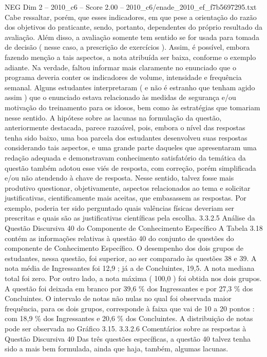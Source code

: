 \begin{textsample}{NEG Dim 2 – 2010\_c6 – Score 2.00 – 2010\_c6/enade\_2010\_ef\_f7b5697295.txt}
Cabe ressaltar, porém, que esses indicadores, em que pese a orientação do razão dos objetivos do praticante, sendo, portanto, dependentes do próprio resultado da avaliação.
Além disso, a avaliação somente tem sentido se for usada para tomada de decisão ( nesse caso, a prescrição de exercícios ).
Assim, é possível, embora fazendo menção a tais aspectos, a nota atribuída ser baixa, conforme o exemplo adiante.
Na verdade, faltou informar mais claramente no enunciado que o programa deveria conter os indicadores de volume, intensidade e frequência semanal.
Alguns estudantes interpretaram ( e não é estranho que tenham agido assim ) que o enunciado estava relacionado às medidas de segurança e/ou motivação do treinamento para os idosos, bem como às estratégias que tomariam nesse sentido.
A hipótese sobre as lacunas na formulação da questão, anteriormente destacada, parece razoável, pois, embora o nível das respostas tenha sido baixo, uma boa parcela dos estudantes desenvolveu suas respostas considerando tais aspectos, e uma grande parte daqueles que apresentaram uma redação adequada e demonstravam conhecimento satisfatório da temática da questão também adotou esse viés de resposta, com correção, porém simplificada e/ou não atendendo à chave de resposta.
Nesse sentido, talvez fosse mais produtivo questionar, objetivamente, aspectos relacionados ao tema e solicitar justificativas, cientificamente mais aceitas, que embasassem as respostas.
Por exemplo, poderia ter sido perguntado quais valências físicas deveriam ser prescritas e quais são as justificativas científicas pela escolha. 3.3.2.5 Análise da Questão Discursiva 40 do Componente de Conhecimento Específico A Tabela 3.18 contém as informações relativas à questão 40 do conjunto de questões do componente de Conhecimento Específico.
O desempenho dos dois grupos de estudantes, nessa questão, foi superior, ao ser comparado às questões 38 e 39.
A nota média de Ingressantes foi 12,9 ; já a de Concluintes, 19,5.
A nota mediana total foi zero.
Por outro lado, a nota máxima ( 100,0 ) foi obtida nos dois grupos.
A questão foi deixada em branco por 39,6 \% dos Ingressantes e por 27,3 \% dos Concluintes.
O intervalo de notas não nulas no qual foi observada maior frequência, para os dois grupos, corresponde à faixa que vai de 10 a 20 pontos : com 18,9 \% dos Ingressantes e 20,6 \% dos Concluintes.
A distribuição de notas pode ser observada no Gráfico 3.15. 3.3.2.6 Comentários sobre as respostas à Questão Discursiva 40 Das três questões específicas, a questão 40 talvez tenha sido a mais bem formulada, ainda que haja, também, algumas lacunas.

\end{textsample}

